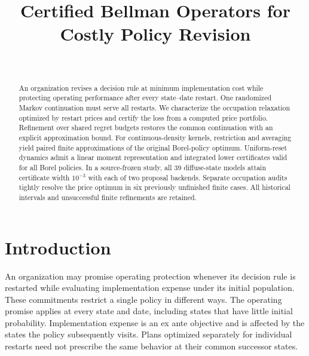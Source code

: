 


\begin{frontmatter}
\title{Certified Bellman Operators for Costly Policy Revision}
\begin{aug}\author[id=au1,addressref={add1}]{~}\address[id=add1]{}\end{aug}
\begin{abstract}
An organization revises a decision rule at minimum implementation cost while protecting operating performance after every state--date restart. One randomized Markov continuation must serve all restarts. We characterize the occupation relaxation optimized by restart prices and certify the loss from a computed price portfolio. Refinement over shared regret budgets restores the common continuation with an explicit approximation bound. For continuous-density kernels, restriction and averaging yield paired finite approximations of the original Borel-policy optimum. Uniform-reset dynamics admit a linear moment representation and integrated lower certificates valid for all Borel policies. In a source-frozen study, all 39 diffuse-state models attain certificate width $10^{-3}$ with each of two proposal backends. Separate occupation audits tightly resolve the price optimum in six previously unfinished finite cases. All historical intervals and unsuccessful finite refinements are retained.
\end{abstract}
\begin{keyword}\end{keyword}
\end{frontmatter}

\section{Introduction}\label{sec:intro50}
An organization may promise operating protection whenever its decision rule is restarted while evaluating implementation expense under its initial population. These commitments restrict a single policy in different ways. The operating promise applies at every state and date, including states that have little initial probability. Implementation expense is an ex ante objective and is affected by the states the policy subsequently visits. Plans optimized separately for individual restarts need not prescribe the same behavior at their common successor states.

